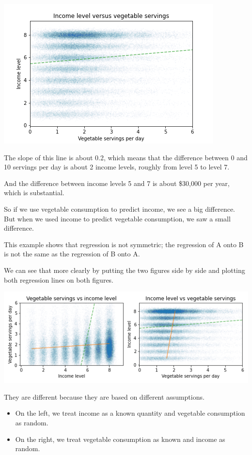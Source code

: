 \includegraphics{chapters/figs/fig09-02.png}

The slope of this line is about 0.2, which means that the difference
between 0 and 10 servings per day is about 2 income levels, roughly from
level 5 to level 7.

And the difference between income levels 5 and 7 is about \$30,000 per
year, which is substantial.

So if we use vegetable consumption to predict income, we see a big
difference. But when we used income to predict vegetable consumption, we
saw a small difference.

This example shows that regression is not symmetric; the regression of A
onto B is not the same as the regression of B onto A.

We can see that more clearly by putting the two figures side by side and
plotting both regression lines on both figures.

\includegraphics{chapters/figs/fig09-03.png}

They are different because they are based on different assumptions.

\begin{itemize}
\item
  On the left, we treat income as a known quantity and vegetable
  consumption as random.
\item
  On the right, we treat vegetable consumption as known and income as
  random.
\end{itemize}

